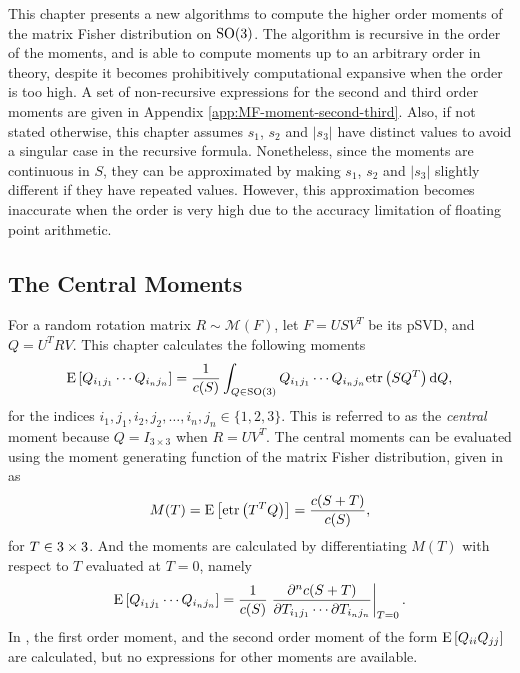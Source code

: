 This chapter presents a new algorithms to compute the higher order moments of the matrix Fisher distribution on $\mathrm{SO}(3)$.
The algorithm is recursive in the order of the moments, and is able to compute moments up to an arbitrary order in theory, despite it becomes prohibitively computational expansive when the order is too high.
A set of non-recursive expressions for the second and third order moments are given in Appendix \ref{app:MF-moment-second-third}.
Also, if not stated otherwise, this chapter assumes $s_1$, $s_2$ and $|s_3|$ have distinct values to avoid a singular case in the recursive formula.
Nonetheless, since the moments are continuous in $S$, they can be approximated by making $s_1$, $s_2$ and $|s_3|$ slightly different if they have repeated values.
However, this approximation becomes inaccurate when the order is very high due to the accuracy limitation of floating point arithmetic.

\subsection{The Central Moments}

For a random rotation matrix $R\sim\mathcal{M}(F)$, let $F=USV^T$ be its pSVD, and $Q = U^TRV$.
This chapter calculates the following moments
\begin{align} \label{eqn:MF-moment-int}
	\mathrm{E}\left[ Q_{i_1j_1} \cdots Q_{i_nj_n} \right] = \frac{1}{c(S)} \int_{Q\in\mathrm{SO}(3)} Q_{i_1j_1} \cdots Q_{i_nj_n} \mathrm{etr}\left( SQ^T \right) \mathrm{d} Q,
\end{align}
for the indices $i_1,j_1,i_2,j_2,\ldots, i_n,j_n\in\{1,2,3\}$.
This is referred to as the \textit{central} moment because $Q=I_{3\times 3}$ when $R= UV^T$.
The central moments can be evaluated using the moment generating function of the matrix Fisher distribution, given in \cite{khatri1977mises,lee2018bayesian} as
\begin{equation}
	M(T) = \mathrm{E}\left[ \mathrm{etr}\left( T^TQ \right) \right] = \frac{c(S+T)}{c(S)},
\end{equation}
for $T\in\real{3\times 3}$. 
And the moments are calculated by differentiating $M(T)$ with respect to $T$ evaluated at $T=0$, namely
\begin{equation} \label{eqn:MF-moment-dcdT}
	\mathrm{E}\left[ Q_{i_1j_1} \cdots Q_{i_nj_n} \right] = \frac{1}{c(S)} \left. \frac{\partial^n c(S+T)}{\partial T_{i_1j_1} \cdots \partial T_{i_nj_n}} \right|_{T=0}.
\end{equation}
In \cite{lee2018bayesian,khatri1977mises}, the first order moment, and the second order moment of the form $\mathrm{E}\left[ Q_{ii}Q_{jj} \right]$ are calculated, but no expressions for other moments are available.

